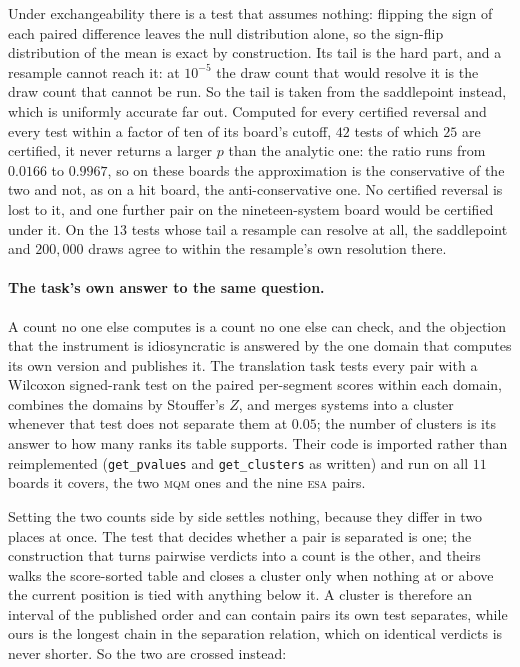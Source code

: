 Under exchangeability there is a test that assumes nothing: flipping the sign of each paired
difference leaves the null distribution alone, so the sign-flip distribution of the mean is exact by
construction. Its tail is the hard part, and a resample cannot reach it: at $10^{-5}$ the draw count that would resolve it is the draw count that cannot be run. So the tail is taken from the
saddlepoint instead, which is uniformly accurate far out. Computed for every certified reversal and
every test within a factor of ten of its board's cutoff, $42$ tests of which $25$ are certified, it
never returns a larger $p$ than the analytic one: the ratio runs from $0.0166$ to $0.9967$, so on
these boards the approximation is the conservative of the two and not, as on a hit board, the
anti-conservative one. No certified reversal is lost to it, and one further pair on the
nineteen-system board would be certified under it. On the $13$ tests whose tail a resample can
resolve at all, the saddlepoint and $200{,}000$ draws agree to within the resample's own resolution
there.

\paragraph{The task's own answer to the same question.} A count no one else computes is a count no
one else can check, and the objection that the instrument is idiosyncratic is answered by the one
domain that computes its own version and publishes it. The translation task tests every pair with a
Wilcoxon signed-rank test on the paired per-segment scores within each domain, combines the domains
by Stouffer's $Z$, and merges systems into a cluster whenever that test does not separate them at
$0.05$; the number of clusters is its answer to how many ranks its table supports. Their code is
imported rather than reimplemented (\texttt{get\_pvalues} and \texttt{get\_clusters} as written) and run on all $11$ boards it covers, the two \textsc{mqm} ones and the nine \textsc{esa} pairs.

Setting the two counts side by side settles nothing, because they differ in two places at once. The
test that decides whether a pair is separated is one; the construction that turns pairwise verdicts
into a count is the other, and theirs walks the score-sorted table and closes a cluster only when
nothing at or above the current position is tied with anything below it. A cluster is therefore an
interval of the published order and can contain pairs its own test separates, while ours is the longest chain in the separation relation, which on identical verdicts is never shorter. So the
two are crossed instead:

